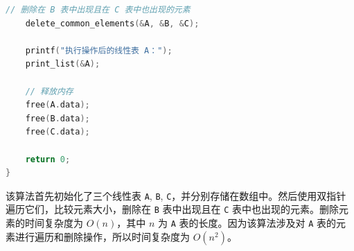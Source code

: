\documentclass[10pt,UTF8]{book} %
\begin{document}
\begin{exercise}
\begin{lstlisting}[language=C]
    // 删除在 B 表中出现且在 C 表中也出现的元素
    delete_common_elements(&A, &B, &C);

    printf("执行操作后的线性表 A：");
    print_list(&A);

    // 释放内存
    free(A.data);
    free(B.data);
    free(C.data);

    return 0;
}

\end{lstlisting}
该算法首先初始化了三个线性表 \lstinline|A|, \lstinline|B|, \lstinline|C|，并分别存储在数组中。然后使用双指针遍历它们，比较元素大小，删除在 \lstinline|B| 表中出现且在 \lstinline|C| 表中也出现的元素。删除元素的时间复杂度为 $O(n)$，其中 $n$ 为 \lstinline|A| 表的长度。因为该算法涉及对 \lstinline|A| 表的元素进行遍历和删除操作，所以时间复杂度为 $O(n^2)$。
\end{exercise}
\end{document}
